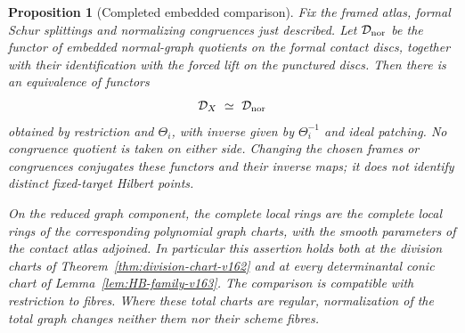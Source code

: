\documentclass[11pt,reqno]{amsart}
\numberwithin{equation}{section}
\newtheorem{proposition}[theorem]{Proposition}
\theoremstyle{definition}\newtheorem{definition}[theorem]{Definition}
\theoremstyle{remark}\newtheorem{remark}[theorem]{Remark}
\begin{document}
\begin{proposition}[Completed embedded comparison]
\label{prop:embedded-functors-v163}
Fix the framed atlas, formal Schur splittings and normalizing
congruences just described. Let $\mathcal D_{\rm nor}$ be the
functor of embedded normal-graph quotients on the formal contact
discs, together with their identification with the forced lift on
the punctured discs. Then there is an equivalence of functors
\begin{equation}\label{eq:functor-comparison-v163}
 \mathcal D_X\ \simeq\ \mathcal D_{\rm nor}
\end{equation}
obtained by restriction and $\Theta_i$, with inverse given by
$\Theta_i^{-1}$ and ideal patching. No congruence quotient is taken
on either side. Changing the chosen frames or congruences conjugates
these functors and their inverse maps; it does not identify distinct
fixed-target Hilbert points.

On the reduced graph component, the complete local rings are the
complete local rings of the corresponding polynomial graph charts,
with the smooth parameters of the contact atlas adjoined. In
particular this assertion holds both at the division charts of
Theorem~\ref{thm:division-chart-v162} and at every determinantal
conic chart of Lemma~\ref{lem:HB-family-v163}. The comparison is
compatible with restriction to fibres. Where these total charts
are regular, normalization of the total graph changes neither them
nor their scheme fibres.
\end{proposition}
\end{document}
